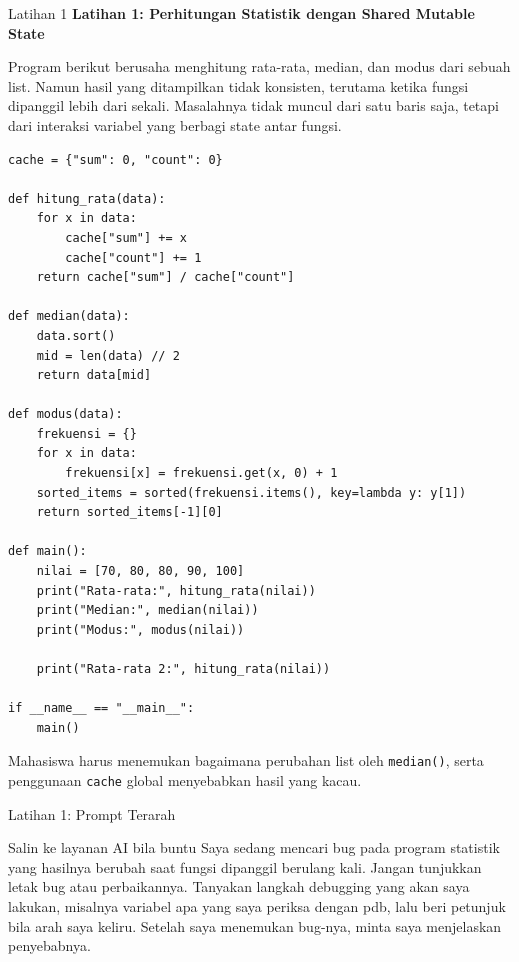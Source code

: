 \documentclass[aspectratio=169, table]{beamer}
\begin{document}
\begin{frame}[fragile,allowframebreaks=0.8]{Latihan 1}
\footnotesize
\textbf{Latihan 1: Perhitungan Statistik dengan Shared Mutable State}\par\medskip
Program berikut berusaha menghitung rata-rata, median, dan modus dari sebuah list. Namun hasil yang ditampilkan tidak konsisten, terutama ketika fungsi dipanggil lebih dari sekali. Masalahnya tidak muncul dari satu baris saja, tetapi dari interaksi variabel yang berbagi state antar fungsi.

\begin{lstlisting}[style=PythonStyle, breaklines=true]
cache = {"sum": 0, "count": 0}

def hitung_rata(data):
    for x in data:
        cache["sum"] += x
        cache["count"] += 1
    return cache["sum"] / cache["count"]

def median(data):
    data.sort()     
    mid = len(data) // 2
    return data[mid]

def modus(data):
    frekuensi = {}
    for x in data:
        frekuensi[x] = frekuensi.get(x, 0) + 1
    sorted_items = sorted(frekuensi.items(), key=lambda y: y[1])
    return sorted_items[-1][0]

def main():
    nilai = [70, 80, 80, 90, 100]
    print("Rata-rata:", hitung_rata(nilai))
    print("Median:", median(nilai))
    print("Modus:", modus(nilai))
    
    print("Rata-rata 2:", hitung_rata(nilai))

if __name__ == "__main__":
    main()
\end{lstlisting}

Mahasiswa harus menemukan bagaimana perubahan list oleh \texttt{median()}, serta penggunaan \texttt{cache} global menyebabkan hasil yang kacau.
\end{frame}

\begin{frame}{Latihan 1: Prompt Terarah}
\begin{block}{Salin ke layanan AI bila buntu}
\small Saya sedang mencari bug pada program statistik yang hasilnya berubah saat fungsi dipanggil berulang kali. Jangan tunjukkan letak bug atau perbaikannya. Tanyakan langkah debugging yang akan saya lakukan, misalnya variabel apa yang saya periksa dengan pdb, lalu beri petunjuk bila arah saya keliru. Setelah saya menemukan bug-nya, minta saya menjelaskan penyebabnya.
\end{block}
\end{frame}
\end{document}
